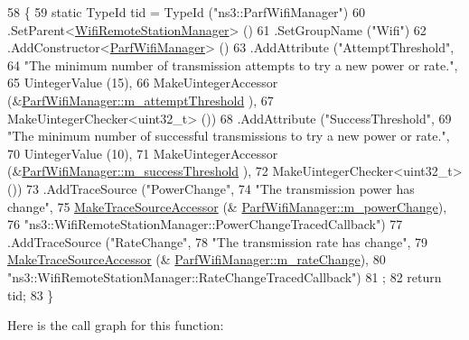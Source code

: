 \begin{DoxyCode}
58 \{
59   \textcolor{keyword}{static} TypeId tid = TypeId (\textcolor{stringliteral}{"ns3::ParfWifiManager"})
60     .SetParent<\hyperlink{classns3_1_1WifiRemoteStationManager_a78524840f5900e1937e8e2d6df48954d}{WifiRemoteStationManager}> ()
61     .SetGroupName (\textcolor{stringliteral}{"Wifi"})
62     .AddConstructor<\hyperlink{classns3_1_1ParfWifiManager_a1df1b5330a16cfa4a3c102e5d250e86e}{ParfWifiManager}> ()
63     .AddAttribute (\textcolor{stringliteral}{"AttemptThreshold"},
64                    \textcolor{stringliteral}{"The minimum number of transmission attempts to try a new power or rate."},
65                    UintegerValue (15),
66                    MakeUintegerAccessor (&\hyperlink{classns3_1_1ParfWifiManager_aab9760bab8628fc4822c12b2dd2bf0ea}{ParfWifiManager::m\_attemptThreshold}
      ),
67                    MakeUintegerChecker<uint32\_t> ())
68     .AddAttribute (\textcolor{stringliteral}{"SuccessThreshold"},
69                    \textcolor{stringliteral}{"The minimum number of successful transmissions to try a new power or rate."},
70                    UintegerValue (10),
71                    MakeUintegerAccessor (&\hyperlink{classns3_1_1ParfWifiManager_a20cddc69111e0c419ae3f4c36e4d4548}{ParfWifiManager::m\_successThreshold}
      ),
72                    MakeUintegerChecker<uint32\_t> ())
73     .AddTraceSource (\textcolor{stringliteral}{"PowerChange"},
74                      \textcolor{stringliteral}{"The transmission power has change"},
75                      \hyperlink{group__tracing_gab21a770b9855af4e8f69f7531ea4a6b0}{MakeTraceSourceAccessor} (&
      \hyperlink{classns3_1_1ParfWifiManager_a3551006adb796a78525bc93430950b21}{ParfWifiManager::m\_powerChange}),
76                      \textcolor{stringliteral}{"ns3::WifiRemoteStationManager::PowerChangeTracedCallback"})
77     .AddTraceSource (\textcolor{stringliteral}{"RateChange"},
78                      \textcolor{stringliteral}{"The transmission rate has change"},
79                      \hyperlink{group__tracing_gab21a770b9855af4e8f69f7531ea4a6b0}{MakeTraceSourceAccessor} (&
      \hyperlink{classns3_1_1ParfWifiManager_a6523cc884410af743890db3d24970f70}{ParfWifiManager::m\_rateChange}),
80                      \textcolor{stringliteral}{"ns3::WifiRemoteStationManager::RateChangeTracedCallback"})
81   ;
82   \textcolor{keywordflow}{return} tid;
83 \}
\end{DoxyCode}


Here is the call graph for this function\+:


